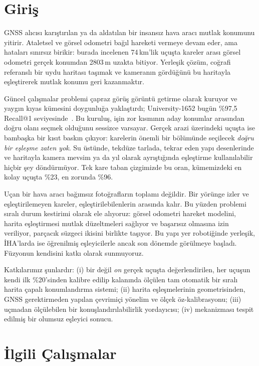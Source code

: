 \documentclass[conference]{IEEEtran}
\begin{document}
\section{Giriş}

GNSS alıcısı karıştırılan ya da aldatılan bir insansız hava aracı mutlak
konumunu yitirir. Ataletsel ve görsel odometri bağıl hareketi vermeye devam
eder, ama hataları sınırsız birikir: burada incelenen 74\,km'lik uçuşta kareler
arası görsel odometri gerçek konumdan 2803\,m uzakta bitiyor. Yerleşik çözüm,
coğrafi referanslı bir uydu haritası taşımak ve kameranın gördüğünü bu haritayla
eşleştirerek mutlak konumu geri kazanmaktır.

Güncel çalışmalar problemi çapraz görüş görüntü getirme olarak kuruyor ve
yaygın kıyas kümesini doygunluğa yaklaştırdı; University-1652 bugün \%97,5
Recall@1 seviyesinde~\cite{mgs2net}. Bu kuruluş, işin zor kısmının aday
konumlar arasından doğru olanı seçmek olduğunu sessizce varsayar. Gerçek arazi
üzerindeki uçuşta ise bambaşka bir kısıt baskın çıkıyor: karelerin önemli bir
bölümünde seçilecek \emph{doğru bir eşleşme zaten yok}. Su üstünde, tekdüze
tarlada, tekrar eden yapı desenlerinde ve haritayla kamera mevsim ya da yıl
olarak ayrıştığında eşleştirme kullanılabilir hiçbir şey döndürmüyor. Tek kare
taban çizgimizde bu oran, kümemizdeki en kolay uçuşta \%23, en zorunda \%96.

Uçan bir hava aracı bağımsız fotoğrafların toplamı değildir. Bir yörünge izler
ve eşleştirilemeyen kareler, eşleştirilebilenlerin arasında kalır. Bu yüzden
problemi sıralı durum kestirimi olarak ele alıyoruz: görsel odometri hareket
modelini, harita eşleştirmesi mutlak düzeltmeleri sağlıyor ve başarısız olmasına
izin veriliyor, parçacık süzgeci ikisini birlikte taşıyor. Bu yapı yer
robotiğinde yerleşik, İHA'larda ise öğrenilmiş eşleyicilerle ancak son
dönemde görülmeye başladı. Füzyonun kendisini katkı olarak sunmuyoruz.

Katkılarımız şunlardır: (i) bir değil \emph{on} gerçek uçuşta değerlendirilen,
her uçuşun kendi ilk \%20'sinden kalibre edilip kalanında ölçülen tam otomatik
bir sıralı harita çapalı konumlandırma sistemi; (ii) harita eşleşmelerinin
geometrisinden, GNSS gerektirmeden yapılan çevrimiçi yönelim ve ölçek
öz-kalibrasyonu; (iii) uçmadan ölçülebilen bir konuşlandırılabilirlik
yordayıcısı; (iv) mekanizması tespit edilmiş bir olumsuz eşleyici sonucu.

\section{İlgili Çalışmalar}
\end{document}
